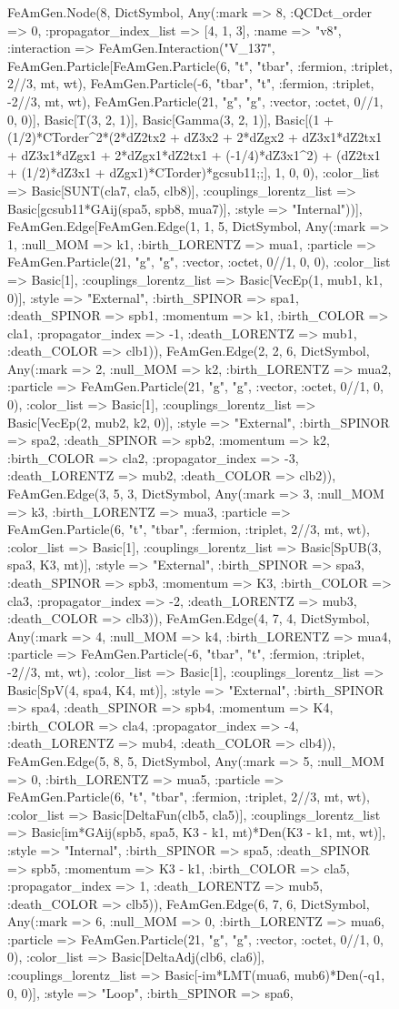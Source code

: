 \documentclass{revtex4}
\begin{document}
\begin{figure}[!htb]
\begin{center}
{FeAmGen.Node(8, Dict{Symbol, Any}(:mark => 8, :QCDct_order => 0, :propagator_index_list => [4, 1, 3], :name => "v8", :interaction => FeAmGen.Interaction("V_137", FeAmGen.Particle[FeAmGen.Particle(6, "t", "tbar", :fermion, :triplet, 2//3, mt, wt), FeAmGen.Particle(-6, "tbar", "t", :fermion, :triplet, -2//3, mt, wt), FeAmGen.Particle(21, "g", "g", :vector, :octet, 0//1, 0, 0)], Basic[T(3, 2, 1)], Basic[Gamma(3, 2, 1)], Basic[(1 + (1/2)*CTorder^2*(2*dZ2tx2 + dZ3x2 + 2*dZgx2 + dZ3x1*dZ2tx1 + dZ3x1*dZgx1 + 2*dZgx1*dZ2tx1 + (-1/4)*dZ3x1^2) + (dZ2tx1 + (1/2)*dZ3x1 + dZgx1)*CTorder)*gcsub11;;], 1, 0, 0), :color_list => Basic[SUNT(cla7, cla5, clb8)], :couplings_lorentz_list => Basic[gcsub11*GAij(spa5, spb8, mua7)], :style => "Internal"))], FeAmGen.Edge[FeAmGen.Edge(1, 1, 5, Dict{Symbol, Any}(:mark => 1, :null_MOM => k1, :birth_LORENTZ => mua1, :particle => FeAmGen.Particle(21, "g", "g", :vector, :octet, 0//1, 0, 0), :color_list => Basic[1], :couplings_lorentz_list => Basic[VecEp(1, mub1, k1, 0)], :style => "External", :birth_SPINOR => spa1, :death_SPINOR => spb1, :momentum => k1, :birth_COLOR => cla1, :propagator_index => -1, :death_LORENTZ => mub1, :death_COLOR => clb1)), FeAmGen.Edge(2, 2, 6, Dict{Symbol, Any}(:mark => 2, :null_MOM => k2, :birth_LORENTZ => mua2, :particle => FeAmGen.Particle(21, "g", "g", :vector, :octet, 0//1, 0, 0), :color_list => Basic[1], :couplings_lorentz_list => Basic[VecEp(2, mub2, k2, 0)], :style => "External", :birth_SPINOR => spa2, :death_SPINOR => spb2, :momentum => k2, :birth_COLOR => cla2, :propagator_index => -3, :death_LORENTZ => mub2, :death_COLOR => clb2)), FeAmGen.Edge(3, 5, 3, Dict{Symbol, Any}(:mark => 3, :null_MOM => k3, :birth_LORENTZ => mua3, :particle => FeAmGen.Particle(6, "t", "tbar", :fermion, :triplet, 2//3, mt, wt), :color_list => Basic[1], :couplings_lorentz_list => Basic[SpUB(3, spa3, K3, mt)], :style => "External", :birth_SPINOR => spa3, :death_SPINOR => spb3, :momentum => K3, :birth_COLOR => cla3, :propagator_index => -2, :death_LORENTZ => mub3, :death_COLOR => clb3)), FeAmGen.Edge(4, 7, 4, Dict{Symbol, Any}(:mark => 4, :null_MOM => k4, :birth_LORENTZ => mua4, :particle => FeAmGen.Particle(-6, "tbar", "t", :fermion, :triplet, -2//3, mt, wt), :color_list => Basic[1], :couplings_lorentz_list => Basic[SpV(4, spa4, K4, mt)], :style => "External", :birth_SPINOR => spa4, :death_SPINOR => spb4, :momentum => K4, :birth_COLOR => cla4, :propagator_index => -4, :death_LORENTZ => mub4, :death_COLOR => clb4)), FeAmGen.Edge(5, 8, 5, Dict{Symbol, Any}(:mark => 5, :null_MOM => 0, :birth_LORENTZ => mua5, :particle => FeAmGen.Particle(6, "t", "tbar", :fermion, :triplet, 2//3, mt, wt), :color_list => Basic[DeltaFun(clb5, cla5)], :couplings_lorentz_list => Basic[im*GAij(spb5, spa5, K3 - k1, mt)*Den(K3 - k1, mt, wt)], :style => "Internal", :birth_SPINOR => spa5, :death_SPINOR => spb5, :momentum => K3 - k1, :birth_COLOR => cla5, :propagator_index => 1, :death_LORENTZ => mub5, :death_COLOR => clb5)), FeAmGen.Edge(6, 7, 6, Dict{Symbol, Any}(:mark => 6, :null_MOM => 0, :birth_LORENTZ => mua6, :particle => FeAmGen.Particle(21, "g", "g", :vector, :octet, 0//1, 0, 0), :color_list => Basic[DeltaAdj(clb6, cla6)], :couplings_lorentz_list => Basic[-im*LMT(mua6, mub6)*Den(-q1, 0, 0)], :style => "Loop", :birth_SPINOR => spa6, }
\end{center}
\end{figure}
\end{document}
